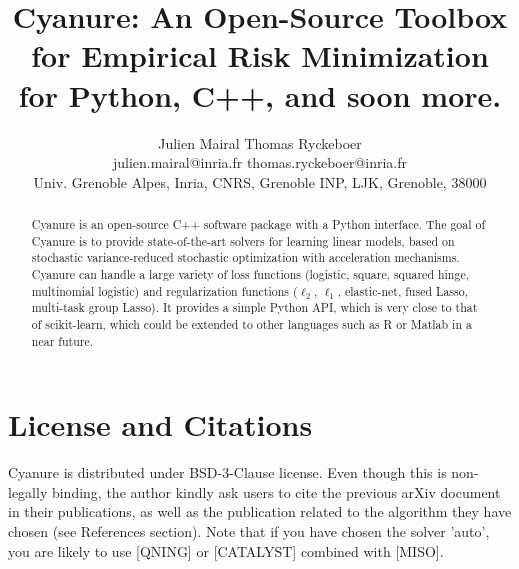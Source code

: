 \documentclass{article}
\title{Cyanure: An Open-Source Toolbox for Empirical Risk Minimization 
for Python, C++, and soon more.
}
\author{
Julien Mairal
\qquad
Thomas Ryckeboer
\\{julien.mairal@inria.fr \qquad thomas.ryckeboer@inria.fr}
\\{Univ. Grenoble Alpes, Inria, CNRS, Grenoble INP, LJK, Grenoble, 38000}}
\begin{document}
\maketitle

\begin{abstract}
   Cyanure is an open-source C++ software package with a Python interface. 
   The goal of Cyanure is to provide state-of-the-art solvers for learning linear models,
   based on stochastic variance-reduced stochastic optimization with
   acceleration mechanisms.
   Cyanure can handle a large variety of loss functions (logistic, square,
   squared hinge, multinomial logistic) and regularization functions ($\ell_2$,
   $\ell_1$, elastic-net, fused Lasso, multi-task group Lasso).
   It provides a simple Python API, which is very close to that of scikit-learn,
   which could be extended to other languages such as R or Matlab in a near future.
\end{abstract}

\section{License and Citations}
Cyanure is distributed under BSD-3-Clause license. Even though this is non-legally binding, the author kindly ask users to cite the previous arXiv document in their publications, as well as the publication related to the algorithm they have chosen (see References section). 
Note that if you have chosen the solver 'auto', you are likely to use [QNING] or [CATALYST] combined with [MISO].
\end{document}
